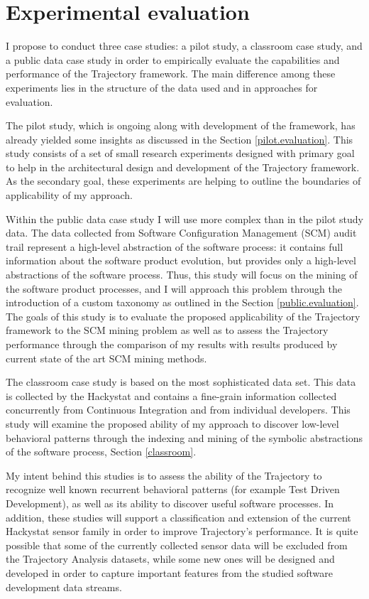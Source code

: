 \chapter{Experimental evaluation} \label{experiments}
I propose to conduct three case studies: a pilot study, a classroom case study, and a public data case study in order to empirically evaluate the capabilities and performance of the Trajectory framework. The main difference among these experiments lies in the structure of the data used and in approaches for evaluation. 

The pilot study, which is ongoing along with development of the framework, has already yielded some insights as discussed in the Section \ref{pilot.evaluation}. This study consists of a set of small research experiments designed with primary goal to help in the architectural design and development of the Trajectory framework. As the secondary goal, these experiments are helping to outline the boundaries of applicability of my approach.

Within the public data case study I will use more complex than in the pilot study data. The data collected from Software Configuration Management (SCM) audit trail represent a high-level abstraction of the software process: it contains full information about the software product evolution, but provides only a high-level abstractions of the software process. Thus, this study will focus on the mining of the software product processes, and I will approach this problem through the introduction of a custom taxonomy as outlined in the Section \ref{public.evaluation}. The goals of this study is to evaluate the proposed applicability of the Trajectory framework to the SCM mining problem as well as to assess the Trajectory performance through the comparison of my results with results produced by current state of the art SCM mining methods.

The classroom case study is based on the most sophisticated data set. This data is collected by the Hackystat and contains a fine-grain information collected concurrently from Continuous Integration and from individual developers. This study will examine the proposed ability of my approach to discover low-level behavioral patterns through the indexing and mining of the symbolic abstractions of the software process, Section \ref{classroom}. 

My intent behind this studies is to assess the ability of the Trajectory to recognize well known recurrent behavioral patterns (for example Test Driven Development), as well as its ability to discover useful software processes. In addition, these studies will support a classification and extension of the current Hackystat sensor family in order to improve Trajectory's performance. It is quite possible that some of the currently collected sensor data will be excluded from the Trajectory Analysis datasets, while some new ones will be designed and developed in order to capture important features from the studied software development data streams.

